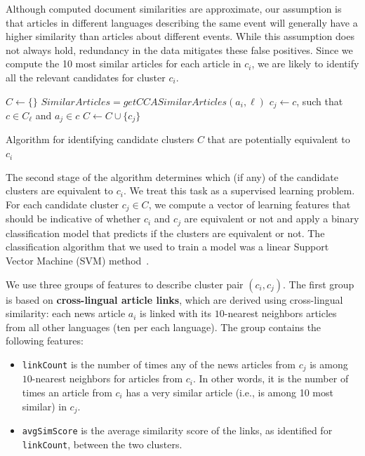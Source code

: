 Although computed document similarities are approximate, our  assumption is that articles 
in different languages describing the same event will generally have a higher similarity 
than articles about different events. While this assumption does not always hold, redundancy 
in the data mitigates these false positives. Since we compute the 10 most similar articles 
for each article in $c_i$, we are likely to identify all the relevant candidates for cluster $c_i$.

\begin{algorithm}[t!]
$C \leftarrow \{\}$\;
 {
     {
        $SimilarArticles = getCCASimilarArticles(a_i, \ell)$\;
         {
            $c_j \leftarrow c$, such that $c \in C_\ell$ and $a_j \in c$\;
            $C \leftarrow C \cup \{ c_j \}$\;
        }
    }
}
\caption{Algorithm for identifying candidate clusters $C$ that are potentially equivalent to $c_i$}
\label{cluster_merge_algo1}
\end{algorithm}

The second stage of the algorithm determines which (if any) of the candidate clusters are equivalent to $c_i$. 
We treat this task as a supervised learning problem. For each candidate cluster $c_j \in C$, we compute 
a vector of learning features that should be indicative of whether $c_i$ and $c_j$ are equivalent or not 
and apply a binary classification model that predicts if the clusters are equivalent or not. The classification 
algorithm that we used to train a model was a linear Support Vector Machine (SVM) method~\cite{shawe-taylor04kernel}.

We use three groups of features to describe cluster pair $(c_i, c_j)$. The first group is based 
on {\bf cross-lingual article links}, which are derived using cross-lingual similarity: 
each news article $a_i$ is linked with its $10$-nearest neighbors articles from all other 
languages (ten per each language). The group contains the following features:

\begin{itemize}
\item \texttt{linkCount} is the number of times any of the news articles from $c_j$ is among $10$-nearest neighbors for articles from $c_i$. In other words, it is the number of times an article from $c_i$ has a very similar article (i.e., is among 10 most similar) in $c_j$.
\item \texttt{avgSimScore} is the average similarity score of the links, as identified for \texttt{linkCount}, between the two clusters.
\end{itemize}


